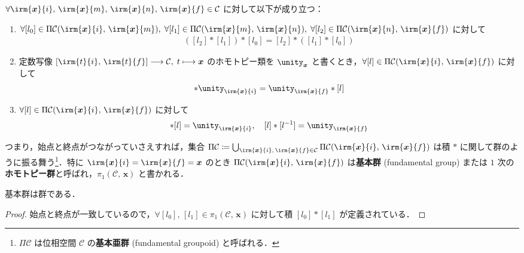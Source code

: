 \documentclass[TQFT_main]{subfiles}
\begin{document}
\begin{mylem}[label=lem:1-1groupoid]{}
    $\forall \irm{\bm{x}}{i},\, \irm{\bm{x}}{m},\, \irm{\bm{x}}{n},\, \irm{\bm{x}}{f} \in \mathcal{C}$ に対して以下が成り立つ：
    \begin{enumerate}
        \item $\forall [l_0]\in \Pi \mathcal{C} (\irm{\bm{x}}{i},\, \irm{\bm{x}}{m}),\; \forall [l_1] \in \Pi \mathcal{C} (\irm{\bm{x}}{m},\, \irm{\bm{x}}{n}),\; \forall [l_2] \in \Pi \mathcal{C} (\irm{\bm{x}}{n},\, \irm{\bm{x}}{f})$ に対して
        \begin{align}
            ([l_2] * [l_1]) * [l_0] = [l_2] * ([l_1] * [l_0])
        \end{align}
        \item 定数写像 $[\irm{t}{i},\, \irm{t}{f}] \lto \mathcal{C},\; t \lmto \bm{x}$ のホモトピー類を $\unity_{\bm{x}}$ と書くとき，$\forall [l] \in \Pi \mathcal{C} (\irm{\bm{x}}{i},\, \irm{\bm{x}}{f})$ に対して
        \begin{align}
            [l] * \unity_{\irm{\bm{x}}{i}} = \unity_{\irm{\bm{x}}{f}} * [l]
        \end{align}
        \item $\forall [l] \in \Pi \mathcal{C} (\irm{\bm{x}}{i},\, \irm{\bm{x}}{f})$ に対して
        \begin{align}
            [l^{-1}] * [l] = \unity_{\irm{\bm{x}}{i}},\quad [l] * [l^{-1}] = \unity_{\irm{\bm{x}}{f}}
        \end{align}
    \end{enumerate}
\end{mylem}
つまり，始点と終点がつながっていさえすれば，集合 $\Pi \mathcal{C} \coloneqq \bigcup_{\irm{\bm{x}}{{i}},\, \irm{\bm{x}}{{f}} \in \mathcal{C}}\Pi \mathcal{C}(\irm{\bm{x}}{{i}},\, \irm{\bm{x}}{{f}})$ は積 $*$ に関して群のように振る舞う\footnote{$\Pi \mathcal{C}$ は位相空間 $\mathcal{C}$ の\textbf{基本亜群} (fundamental groupoid) と呼ばれる．}．特に $\irm{\bm{x}}{i} = \irm{\bm{x}}{f} = \bm{x}$ のとき $\Pi \mathcal{C}(\irm{\bm{x}}{i},\, \irm{\bm{x}}{f})$ は\textbf{基本群} (fundamental group) または $1$ 次の\textbf{ホモトピー群}と呼ばれ，$\pi_1 (\mathcal{C},\, \bm{x})$ と書かれる．

\begin{mylem}[]{}
    基本群は群である．
\end{mylem}

\begin{proof}
    始点と終点が一致しているので，$\forall [l_0],\, [l_1] \in \pi_1 (\mathcal{C},\, \bm{x})$ に対して積 $[l_0] * [l_1]$ が定義されている．
\end{proof}
\end{document}
